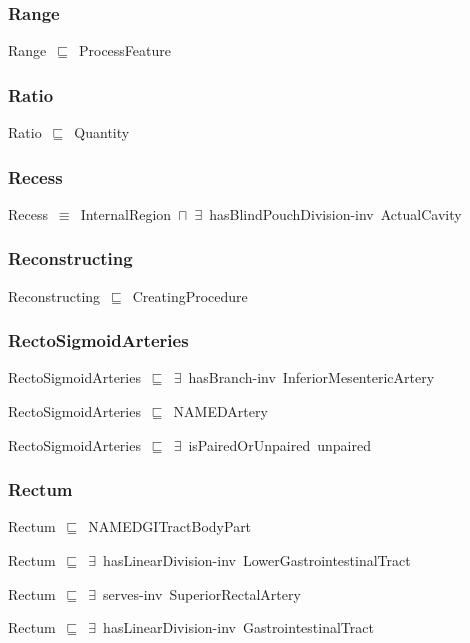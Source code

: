 \documentclass{article}
\begin{document}
\subsubsection*{Range}

Range~\ensuremath{\sqsubseteq}~ProcessFeature~

\subsubsection*{Ratio}

Ratio~\ensuremath{\sqsubseteq}~Quantity~

\subsubsection*{Recess}

Recess~\ensuremath{\equiv}~InternalRegion~\ensuremath{\sqcap}~\ensuremath{\exists}~hasBlindPouchDivision-inv~ActualCavity

\subsubsection*{Reconstructing}

Reconstructing~\ensuremath{\sqsubseteq}~CreatingProcedure~

\subsubsection*{RectoSigmoidArteries}

RectoSigmoidArteries~\ensuremath{\sqsubseteq}~\ensuremath{\exists}~hasBranch-inv~InferiorMesentericArtery~

RectoSigmoidArteries~\ensuremath{\sqsubseteq}~NAMEDArtery~

RectoSigmoidArteries~\ensuremath{\sqsubseteq}~\ensuremath{\exists}~isPairedOrUnpaired~unpaired~

\subsubsection*{Rectum}

Rectum~\ensuremath{\sqsubseteq}~NAMEDGITractBodyPart~

Rectum~\ensuremath{\sqsubseteq}~\ensuremath{\exists}~hasLinearDivision-inv~LowerGastrointestinalTract~

Rectum~\ensuremath{\sqsubseteq}~\ensuremath{\exists}~serves-inv~SuperiorRectalArtery~

Rectum~\ensuremath{\sqsubseteq}~\ensuremath{\exists}~hasLinearDivision-inv~GastrointestinalTract~
\end{document}
